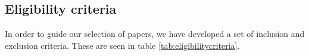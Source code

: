 \subsection{Eligibility criteria}
    
In order to guide our selection of papers, we have developed a set of inclusion and exclusion criteria. These are seen in table \ref{tab:eligibilitycriteria}. 

